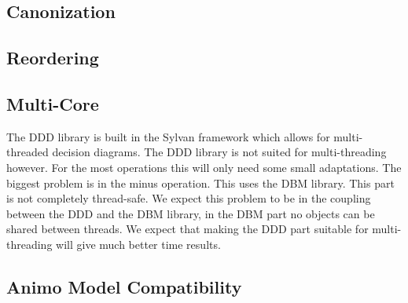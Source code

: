 \subsection{Canonization}

\subsection{Reordering}

\subsection{Multi-Core}
The DDD library is built in the Sylvan framework which allows for multi-threaded decision diagrams. The DDD library is not suited for multi-threading however. For the most operations this will only need some small adaptations. The biggest problem is in the minus operation. This uses the DBM library. This part is not completely thread-safe. We expect this problem to be in the coupling between the DDD and the DBM library, in the DBM part no objects can be shared between threads. We expect that making the DDD part suitable for multi-threading will give much better time results.

\subsection{Animo Model Compatibility}